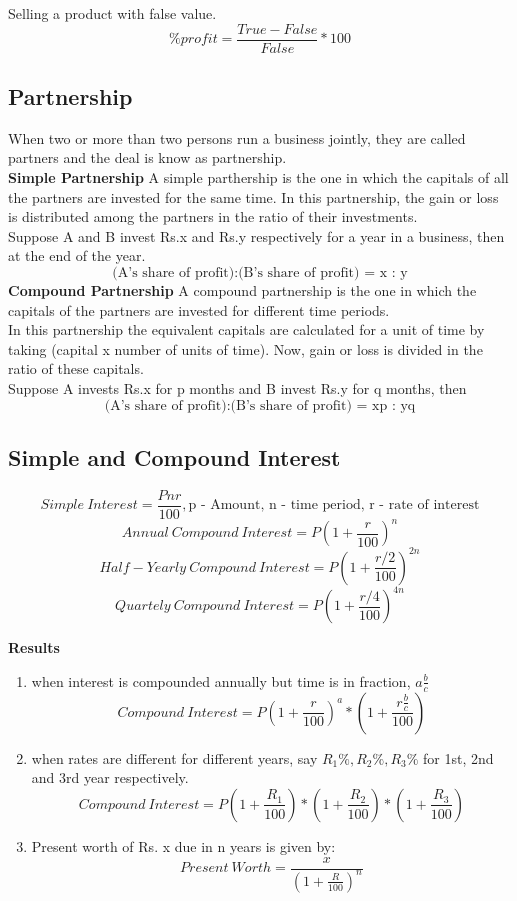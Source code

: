 Selling a product with false value.
\[\%profit= \frac{True - False}{False}*100\]


\subsection{Partnership}
When two or more than two persons run a business jointly, they are called partners and the deal is know as partnership.\vspace{0.2cm}\\
\textbf{Simple Partnership} A simple parthership is the one in which the capitals of all the partners are invested for the same time. In this partnership, the gain or loss is distributed among the partners in the ratio of their investments.\\
Suppose A and B invest Rs.x and Rs.y respectively for a year in a business, then at the end of the year.\\
\[\text{(A's share of profit):(B's share of profit) = x : y}\]
\textbf{Compound Partnership} A compound partnership is the one in which the capitals of the partners are invested for different time periods.\\
In this partnership the equivalent capitals are calculated for a unit of time by taking (capital x number of units of time). Now, gain or loss is divided in the ratio of these capitals.\\
Suppose A invests Rs.x for p months and B invest Rs.y for q months, then
\[\text{(A's share of profit):(B's share of profit) = xp : yq}\]


\subsection{Simple and Compound Interest}
\begin{fleqn}
\[Simple\ Interest=\frac{Pnr}{100}, \text{p - Amount, n - time period, r - rate of interest}\]
\[Annual\ Compound\ Interest=P\left(1+\frac{r}{100} \right)^n\]
\[Half-Yearly\ Compound\ Interest=P\left(1+\frac{r/2}{100} \right)^{2n}\]
\[Quartely\ Compound\ Interest=P\left(1+\frac{r/4}{100} \right)^{4n}\]
\end{fleqn}
{\textbf{\large{Results}}}\\
\begin{enumerate}
    \item when interest is compounded annually but time is in fraction, \(a\frac{b}{c}\)
    \[Compound\ Interest=P\left(1+\frac{r}{100} \right)^a*\left(1+\frac{r\frac{b}{c}}{100} \right)\]
    \item when rates are different for different years, say \(R_1\%, R_2\%, R_3\%\) for 1st, 2nd and 3rd year respectively.
    \[Compound\ Interest=P\left(1+\frac{R_1}{100} \right)*\left(1+\frac{R_2}{100} \right)*\left(1+\frac{R_3}{100} \right)\]
    \item Present worth of Rs. x due in n years is given by:
    \[Present\ Worth=\frac{x}{\left(1 + \frac{R}{100}\right)^n}\]
\end{enumerate}


